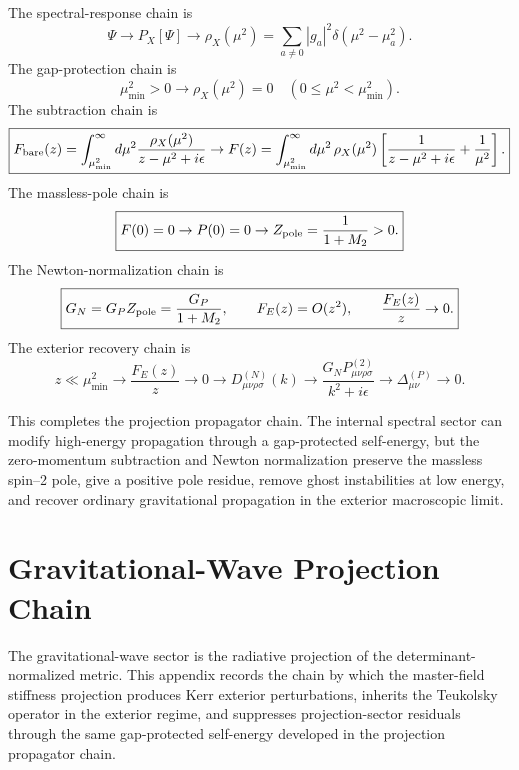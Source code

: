 \documentclass[11pt]{article}
\begin{document}
The spectral-response chain is
\begin{equation}
\boxed{
\Psi
\rightarrow
P_X[\Psi]
\rightarrow
\rho_X(\mu^2)
=
\sum_{a\neq0}
|g_a|^2
\delta(\mu^2-\mu_a^2).
}
\end{equation}
The gap-protection chain is
\begin{equation}
\boxed{
\mu_{\min}^2>0
\rightarrow
\rho_X(\mu^2)=0
\quad
(0\leq\mu^2<\mu_{\min}^2).
}
\end{equation}
The subtraction chain is
\begin{equation}
\boxed{
F_{\rm bare}(z)
=
\int_{\mu_{\min}^2}^{\infty}
d\mu^2
\frac{\rho_X(\mu^2)}{z-\mu^2+i\epsilon}
\rightarrow
F(z)
=
\int_{\mu_{\min}^2}^{\infty}
d\mu^2\,
\rho_X(\mu^2)
\left[
\frac{1}{z-\mu^2+i\epsilon}
+
\frac{1}{\mu^2}
\right].
}
\end{equation}
The massless-pole chain is
\begin{equation}
\boxed{
F(0)=0
\rightarrow
P(0)=0
\rightarrow
Z_{\rm pole}
=
\frac{1}{1+M_2}
>
0.
}
\end{equation}
The Newton-normalization chain is
\begin{equation}
\boxed{
G_N
=
G_PZ_{\rm pole}
=
\frac{G_P}{1+M_2},
\qquad
F_E(z)=O(z^2),
\qquad
\frac{F_E(z)}{z}\rightarrow0.
}
\end{equation}
The exterior recovery chain is
\begin{equation}
\boxed{
z\ll\mu_{\min}^2
\rightarrow
\frac{F_E(z)}{z}\rightarrow0
\rightarrow
D_{\mu\nu\rho\sigma}^{(N)}(k)
\rightarrow
\frac{
G_NP_{\mu\nu\rho\sigma}^{(2)}
}{
k^2+i\epsilon
}
\rightarrow
\Delta_{\mu\nu}^{(P)}\rightarrow0.
}
\end{equation}

This completes the projection propagator chain. The internal spectral sector can
modify high-energy propagation through a gap-protected self-energy, but the
zero-momentum subtraction and Newton normalization preserve the massless
spin--2 pole, give a positive pole residue, remove ghost instabilities at low
energy, and recover ordinary gravitational propagation in the exterior
macroscopic limit.

\section{Gravitational-Wave Projection Chain}
\label{sec:gravitational_wave_projection_chain}

The gravitational-wave sector is the radiative projection of the determinant-normalized metric. This appendix records the chain by which the master-field stiffness projection produces Kerr exterior perturbations, inherits the Teukolsky operator in the exterior regime, and suppresses projection-sector residuals through the same gap-protected self-energy developed in the projection propagator chain.
\end{document}

